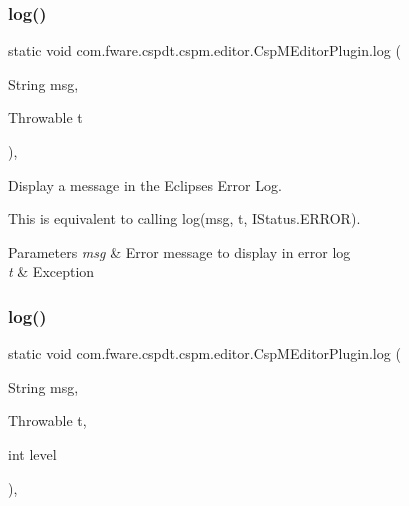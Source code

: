 \subsubsection{\texorpdfstring{log()}{log()}\hspace{0.1cm}{\footnotesize\ttfamily [1/2]}}
{\footnotesize\ttfamily static void com.\+fware.\+cspdt.\+cspm.\+editor.\+Csp\+M\+Editor\+Plugin.\+log (\begin{DoxyParamCaption}\item[{String}]{msg,  }\item[{Throwable}]{t }\end{DoxyParamCaption})\hspace{0.3cm}{\ttfamily [inline]}, {\ttfamily [static]}}



Display a message in the Eclipse\textquotesingle{}s Error Log. 

This is equivalent to calling {\ttfamily log(msg, t, I\+Status.\+E\+R\+R\+OR)}.


\begin{DoxyParams}{Parameters}
{\em msg} & Error message to display in error log \\
\hline
{\em t} & Exception \\
\hline
\end{DoxyParams}
\mbox{\label{classcom_1_1fware_1_1cspdt_1_1cspm_1_1editor_1_1_csp_m_editor_plugin_a2c4fa5b39642bfadc3af60a6ea74065c}} 
\subsubsection{\texorpdfstring{log()}{log()}\hspace{0.1cm}{\footnotesize\ttfamily [2/2]}}
{\footnotesize\ttfamily static void com.\+fware.\+cspdt.\+cspm.\+editor.\+Csp\+M\+Editor\+Plugin.\+log (\begin{DoxyParamCaption}\item[{String}]{msg,  }\item[{Throwable}]{t,  }\item[{int}]{level }\end{DoxyParamCaption})\hspace{0.3cm}{\ttfamily [inline]}, {\ttfamily [static]}}



